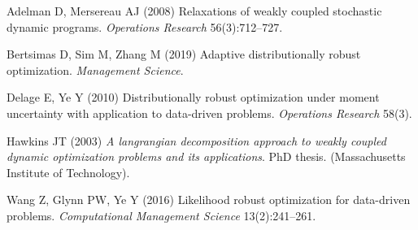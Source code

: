 \documentclass[
  a4paper,
,tablecaptionabove
]{scrartcl}
\numberwithin{equation}{section}
\newlength{\cslhangindent}
\newenvironment{cslreferences}%
  {\setlength{\parindent}{0pt}%
  \everypar{\setlength{\hangindent}{\cslhangindent}}\ignorespaces}%
  {\par}
\begin{document}
\hypertarget{refs}{}
\begin{cslreferences}
  \leavevmode\hypertarget{ref-adelman_relaxations_2008}{}%
  Adelman D, Mersereau AJ (2008) Relaxations of weakly coupled stochastic
  dynamic programs. \emph{Operations Research} 56(3):712--727.

  \leavevmode\hypertarget{ref-bertsimas_adaptive_2019}{}%
  Bertsimas D, Sim M, Zhang M (2019) Adaptive distributionally robust
  optimization. \emph{Management Science}.

  \leavevmode\hypertarget{ref-delage_distributionally_2010}{}%
  Delage E, Ye Y (2010) Distributionally robust optimization under moment
  uncertainty with application to data-driven problems. \emph{Operations
    Research} 58(3).

  \leavevmode\hypertarget{ref-hawkins_langrangian_2003}{}%
  Hawkins JT (2003) \emph{A langrangian decomposition approach to weakly
    coupled dynamic optimization problems and its applications}. PhD thesis.
  (Massachusetts Institute of Technology).

  \leavevmode\hypertarget{ref-wang_likelihood_2016}{}%
  Wang Z, Glynn PW, Ye Y (2016) Likelihood robust optimization for
  data-driven problems. \emph{Computational Management Science}
  13(2):241--261.
\end{cslreferences}
\end{document}
